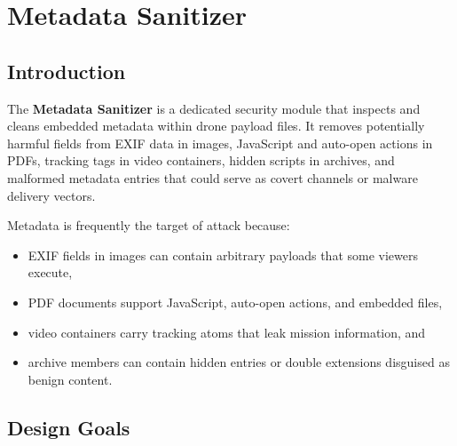 \documentclass[12pt, a4paper]{report}
\begin{document}
\cleardoublepage


\chapter{Metadata Sanitizer}
\label{chap:metadata_sanitizer}

\section{Introduction}

The \textbf{Metadata Sanitizer} is a dedicated security module that
inspects and cleans embedded metadata within drone payload files. It
removes potentially harmful fields from EXIF data in images, JavaScript
and auto-open actions in PDFs, tracking tags in video containers, hidden
scripts in archives, and malformed metadata entries that could serve as
covert channels or malware delivery vectors.

Metadata is frequently the target of attack because:
\begin{itemize}
    \item EXIF fields in images can contain arbitrary payloads that
          some viewers execute,
    \item PDF documents support JavaScript, auto-open actions, and
          embedded files,
    \item video containers carry tracking atoms that leak mission
          information, and
    \item archive members can contain hidden entries or double extensions
          disguised as benign content.
\end{itemize}

\section{Design Goals}
\end{document}
